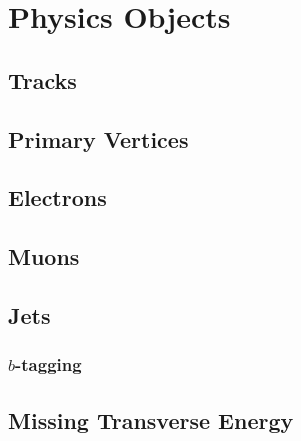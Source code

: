 \chapter{Physics Objects}
\label{sec:objects}

\section{Tracks}
\label{sec:tracks}

\section{Primary Vertices}
\label{sec:pv}

\section{Electrons}
\label{sec:electrons}

\section{Muons}
\label{sec:muons}

\section{Jets}
\label{sec:jets}

\subsection{$b$-tagging}
\label{sec:btag}

\section{Missing Transverse Energy}
\label{sec:met}
